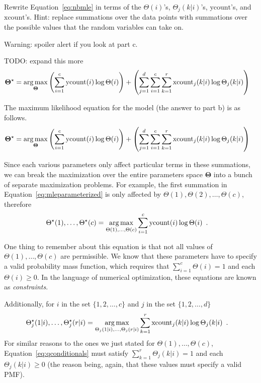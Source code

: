 \documentclass[assignment03_Solutions]{subfiles}
\begin{document}
\begin{exercise}[(60 minutes)]
Rewrite Equation~\ref{eq:nbmle} in terms of the $\Theta(i)$'s, $\Theta_{j}(k|i)$'s, $\mbox{ycount}$'s, and $\mbox{xcount}$'s.  Hint: replace summations over the data points with summations over the possible values that the random variables can take on.

Warning: spoiler alert if you look at part c.
\begin{boxedsolution}
TODO: expand this more
\begin{align}
\mathbf{\Theta}^\star &= \operatorname*{arg\,max}_{\mathbf{\Theta}} \left ( \sum_{i=1}^c \mbox{ycount}(i) \log \Theta(i)  \right) +  \left ( \sum_{j=1}^d \sum_{i=1}^c \sum_{k=1}^r \mbox{xcount}_j(k|i) \log \Theta_j(k|i) \right )
\end{align}
\end{boxedsolution}

\item The maximum likelihood equation for the model (the answer to part b) is as follows.
\begin{align}
\mathbf{\Theta}^\star &= \operatorname*{arg\,max}_{\mathbf{\Theta}} \left ( \sum_{i=1}^c \mbox{ycount}(i) \log \Theta(i)  \right) +  \left ( \sum_{j=1}^d \sum_{i=1}^c \sum_{k=1}^r \mbox{xcount}_j(k|i) \log \Theta_j(k|i) \right ) \label{eq:mleparameterized}
\end{align}

Since each various parameters only affect particular terms in these summations, we can break the maximization over the entire parameters space $\mathbf{\Theta}$ into a bunch of separate maximization problems.  For example, the first summation in Equation~\ref{eq:mleparameterized} is only affected by $\Theta(1), \Theta(2), \ldots, \Theta(c)$, therefore
\begin{align}
\Theta^\star(1), \ldots, \Theta^\star(c)&= \operatorname*{arg\,max}_{\Theta(1), \ldots, \Theta(c)}\sum_{i=1}^c \mbox{ycount}(i) \log \Theta(i) \enspace . \label{eq:qmarginals}
\end{align}

One thing to remember about this equation is that not all values of $\Theta(1), \ldots, \Theta(c)$ are permissible.  We know that these parameters have to specify a valid probability mass function, which requires that $\sum_{i=1}^c \Theta(i) = 1$ and each $\Theta(i) \geq 0$. In the language of numerical optimization, these equations are known as \emph{constraints}.

Additionally, for $i$ in the set $\{1, 2, \ldots, c\}$ and $j$ in the set $\{1, 2, \ldots, d\}$
\begin{align}
\Theta_j^\star(1|i), \ldots, \Theta^\star_j(r|i) &= \operatorname*{arg\,max}_{\Theta_j(1|i), \ldots, \Theta_j(r|i)}\sum_{k=1}^r \mbox{xcount}_j(k|i) \log \Theta_j(k|i) \enspace . \label{eq:qconditionals}
\end{align}
For similar reasons to the ones we just stated for  $\Theta(1), \ldots, \Theta(c)$, Equation~\ref{eq:qconditionals} must satisfy $\sum_{k=1}^r \Theta_j(k|i) = 1$  and each $\Theta_j(k|i) \geq 0$ (the reason being, again, that these values must specify a valid PMF).


\end{exercise}
\end{document}
